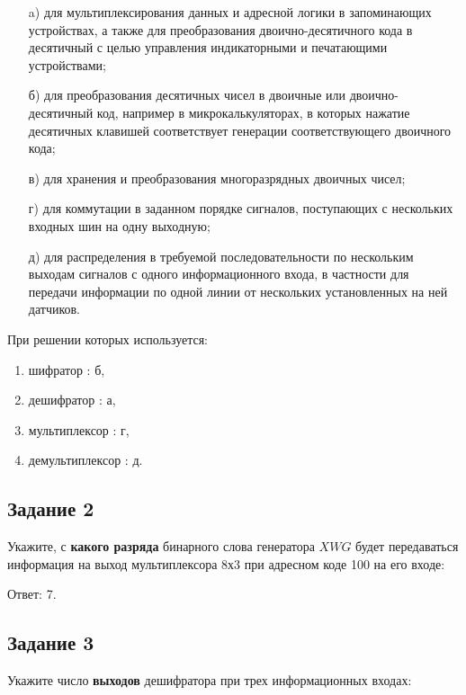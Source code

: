 \documentclass[bachelor, och, labwork]{shiza}
\begin{document}
    \begin{enumerate}
        \item[a)] для мультиплексирования данных и адресной логики в запоминающих
        устройствах, а также для преобразования двоично-десятичного кода в 
        десятичный с целью управления индикаторными и печатающими устройствами;

        \item[б)] для преобразования десятичных чисел в двоичные или двоично-десятичный
        код, например в микрокалькуляторах, в которых нажатие десятичных
        клавишей соответствует генерации соответствующего двоичного кода;

        \item[в)] для хранения и преобразования многоразрядных двоичных чисел;
        
        \item[г)] для коммутации в заданном порядке сигналов, поступающих с
        нескольких входных шин на одну выходную;

        \item[д)] для распределения в требуемой последовательности по нескольким 
        выходам сигналов с одного информационного входа, в частности для передачи 
        информации по одной линии от нескольких установленных на ней датчиков.
    \end{enumerate}
    При решении которых используется:
    \begin{enumerate}
        \item шифратор        : б,
        \item дешифратор      : а,
        \item мультиплексор   : г,
        \item демультиплексор : д.
    \end{enumerate}

\subsection{Задание 2}
    Укажите, с \textbf{какого разряда} бинарного слова генератора $XWG$ будет
    передаваться информация на выход мультиплексора 8х3 при адресном коде 100
    на его входе:
    
    Ответ: 7.

\subsection{Задание 3}
    Укажите число \textbf{выходов} дешифратора при трех информационных входах:
\end{document}
